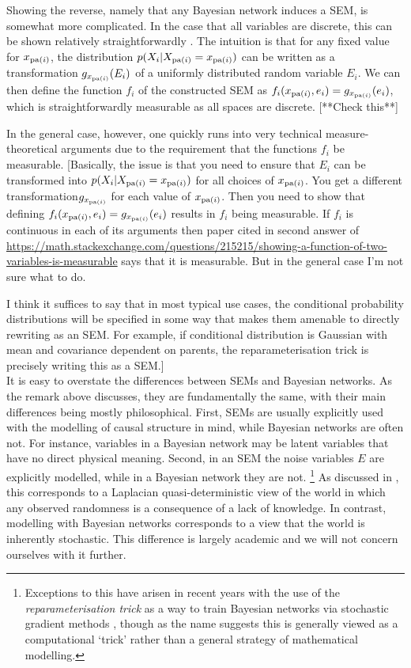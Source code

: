 Showing the reverse, namely that any Bayesian network induces a SEM, is somewhat more complicated. In the case that all variables are discrete, this can be shown relatively straightforwardly \cite{druzdzel1993causality}. The intuition is that for any fixed value for $x_{\operatorname{pa}(i)}$,  the distribution $p(X_i | X_{\operatorname{pa}(i)}=x_{\operatorname{pa}(i)})$ can be written as a transformation $g_{x_{\operatorname{pa}(i)}}(E_i)$ of a uniformly distributed random variable $E_i$. We can then define the function $f_i$ of the constructed SEM as $f_i(x_{\operatorname{pa}(i)}, e_i) = g_{x_{\operatorname{pa}(i)}}(e_i)$, which is straightforwardly measurable as all spaces are discrete. [**Check this**]

In the general case, however, one quickly runs into very technical measure-theoretical arguments due to the requirement that the functions $f_i$ be measurable. [Basically, the issue is that you need to ensure that $E_i$ can be transformed into $p(X_i | X_{\operatorname{pa}(i)}=x_{\operatorname{pa}(i)})$ for all choices of $x_{\operatorname{pa}(i)}$. You get a different transformation$g_{x_{\operatorname{pa}(i)}}$ for each value of $x_{\operatorname{pa}(i)}$. Then you need to show that defining $f_i(x_{\operatorname{pa}(i)}, e_i) = g_{x_{\operatorname{pa}(i)}}(e_i)$ results in $f_i$ being measurable. If $f_i$ is continuous in each of its arguments then paper cited in second answer of \url{https://math.stackexchange.com/questions/215215/showing-a-function-of-two-variables-is-measurable} says that it is measurable. But in the general case I'm not sure what to do. 

I think it suffices to say that in most typical use cases, the conditional probability distributions will be specified in some way that makes them amenable to directly rewriting as an SEM. For example, if conditional distribution is Gaussian with mean and covariance dependent on parents, the reparameterisation trick is precisely writing this as a SEM.]
\\




It is easy to overstate the differences between SEMs and Bayesian networks. As the remark above discusses, they are fundamentally the same, with their main differences being mostly philosophical.
First, SEMs are usually explicitly used with the modelling of causal structure in mind, while Bayesian networks are often not. For instance, variables in a Bayesian network may be latent variables that have no direct physical meaning.
Second, in an SEM the noise variables $E$ are explicitly modelled, while in a Bayesian network they are not. \footnote{Exceptions to this have arisen in recent years with the use of the \emph{reparameterisation trick} as a way to train Bayesian networks via stochastic gradient methods \citep{kingma, rezende}, though as the name suggests this is generally viewed as a computational `trick' rather than a general strategy of mathematical modelling.}
As discussed in \cite{pearl}, this corresponds to a Laplacian quasi-deterministic view of the world in which any observed randomness is a consequence of a lack of knowledge. In contrast, modelling with Bayesian networks corresponds to a view that the world is inherently stochastic. This difference is largely academic and we will not concern ourselves with it further.

